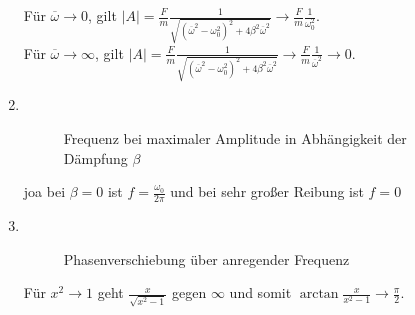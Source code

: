 \documentclass[sectionformat = exercise]{gadsescript}
\begin{document}
\begin{enumerate}[label=\alph*)]
		Für $ \overline{\omega} \to 0 $, gilt $ |A| = \frac{ F }{ m } \frac{ 1 }{ \sqrt{(\overline{\omega}^2 - \omega_0^2)^2 + 4\beta^2\overline{\omega}^2 } } \to \frac{ F }{ m } \frac{ 1 }{ \omega_0^2 } $.\\
		Für $ \overline{\omega} \to \infty $, gilt $ |A| = \frac{ F }{ m } \frac{ 1 }{ \sqrt{(\overline{\omega}^2 - \omega_0^2)^2 + 4\beta^2\overline{\omega}^2 } } \to \frac{ F }{ m } \frac{ 1 }{ \overline{\omega}^2 } \to 0 $.
	\item ~
		\begin{figure}[H]
			\centering
			\caption{Frequenz bei maximaler Amplitude in Abhängigkeit der Dämpfung $ \beta $}
			\label{no}
		\end{figure}
		joa bei $ \beta = 0 $ ist $ f = \frac{\omega_0}{ 2\pi  }  $ und bei sehr großer Reibung ist $ f = 0 $
	\item ~
		\begin{figure}[H]
			\centering
			\caption{Phasenverschiebung über anregender Frequenz}
			\label{Phasenverschiebung}
		\end{figure}
	Für $ x^2 \to 1 $ geht $ \frac{ x }{ \sqrt{x^2 - 1}  }  $ gegen $ \infty $ und somit $ \arctan \frac{ x }{ x^2 - 1 } \to \frac{\pi }{ 2 }  $.
\end{enumerate}
\end{document}
